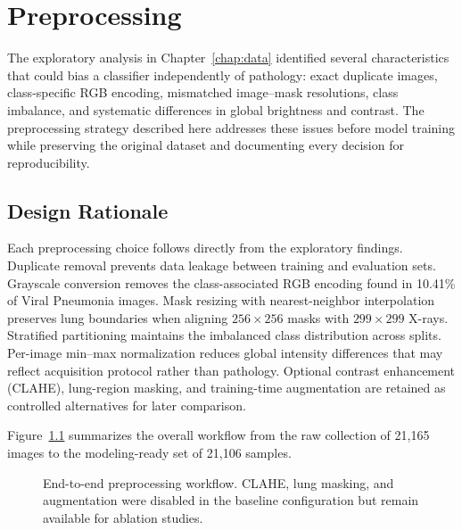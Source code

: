 \chapter{Preprocessing}
\label{chap:preprocessing}

The exploratory analysis in Chapter~\ref{chap:data} identified several characteristics
that could bias a classifier independently of pathology: exact duplicate images,
class-specific RGB encoding, mismatched image--mask resolutions, class imbalance,
and systematic differences in global brightness and contrast. The preprocessing
strategy described here addresses these issues before model training while
preserving the original dataset and documenting every decision for reproducibility.

\section{Design Rationale}

Each preprocessing choice follows directly from the exploratory findings.
Duplicate removal prevents data leakage between training and evaluation sets.
Grayscale conversion removes the class-associated RGB encoding found in
10.41\% of Viral Pneumonia images. Mask resizing with nearest-neighbor
interpolation preserves lung boundaries when aligning $256 \times 256$ masks
with $299 \times 299$ X-rays. Stratified partitioning maintains the imbalanced
class distribution across splits. Per-image min--max normalization reduces
global intensity differences that may reflect acquisition protocol rather than
pathology. Optional contrast enhancement (CLAHE), lung-region masking, and
training-time augmentation are retained as controlled alternatives for later
comparison.

Figure~\ref{fig:preprocessing_flow} summarizes the overall workflow from the
raw collection of 21{,}165 images to the modeling-ready set of 21{,}106 samples.

\begin{figure}[H]
    \centering
    \caption{End-to-end preprocessing workflow. CLAHE, lung masking, and augmentation were disabled in the baseline configuration but remain available for ablation studies.}
    \label{fig:preprocessing_flow}
\end{figure}

